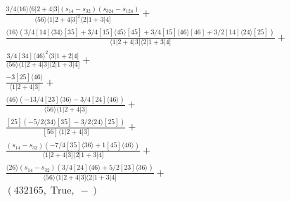 \documentclass[varwidth, border=5pt]{standalone}
\begin{document}
\begin{my}
$\begin{gathered}
\scriptscriptstyle\frac{3/4⟨16⟩⟨6|2+4|3](s_{14}-s_{32})(s_{324}-s_{124})}{⟨56⟩⟨1|2+4|3]^2⟨2|1+3|4]}+\\
\scriptscriptstyle\frac{⟨16⟩(3/4[14]⟨34⟩[35]+3/4[15]⟨45⟩[45]+3/4[15]⟨46⟩[46]+3/2[14]⟨24⟩[25])}{⟨1|2+4|3]⟨2|1+3|4]}+\\
\scriptscriptstyle\frac{3/4[34]⟨46⟩^2⟨3|1+2|4]}{⟨56⟩⟨1|2+4|3]⟨2|1+3|4]}+\\
\scriptscriptstyle\frac{-3[25]⟨46⟩}{⟨1|2+4|3]}+\\
\scriptscriptstyle\frac{⟨46⟩(-13/4[23]⟨36⟩-3/4[24]⟨46⟩)}{⟨56⟩⟨1|2+4|3]}+\\
\scriptscriptstyle\frac{[25](-5/2⟨34⟩[35]-3/2⟨24⟩[25])}{[56]⟨1|2+4|3]}+\\
\scriptscriptstyle\frac{(s_{14}-s_{32})(-7/4[35]⟨36⟩+1[45]⟨46⟩)}{⟨1|2+4|3]⟨2|1+3|4]}+\\
\scriptscriptstyle\frac{⟨26⟩(s_{14}-s_{32})(3/4[24]⟨46⟩+5/2[23]⟨36⟩)}{⟨56⟩⟨1|2+4|3]⟨2|1+3|4]}+\\
\scriptscriptstyle(432165,\;\text{True},\;-)\phantom{+}
\end{gathered}$
\end{my}
\end{document}
